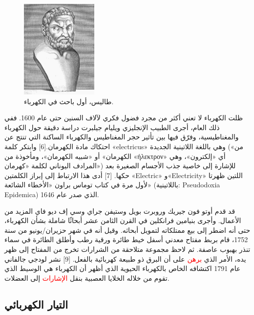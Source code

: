 \documentclass[a4paper]{book}
\begin{document}
\begin{figure}
\centering
  \includegraphics{Thales.png}
  \caption{طاليس، أول باحث في الكهرباء.}
\end{figure}

ظلت الكهرباء لا تعني أكثر من مجرد فضول فكري لآلاف السنين حتى عام
1600. ففي ذلك العام، أجرى الطبيب الإنجليزي ويليام جيلبرت دراسة دقيقة
حول الكهرباء والمغناطيسية، وفرّق فيها بين تأثير حجر المغناطيس والكهرباء
الساكنة التي تنتج عن احتكاك مادة الكهرمان.[6] وابتكر كلمة «electricus»
وهي باللغة اللاتينية الجديدة («من الكهرمان» أو «شبيه الكهرمان»،
ومأخوذة من «ήλεκτρον» أي «إلكترون»، وهي المرادف اليوناني لكلمة
«كهرمان») للإشارة إلى خاصية جذب الأجسام الصغيرة بعد حكها. [7] أدى هذا
الارتباط إلى إبراز الكلمتين «Electric» و«Electricity» اللتين ظهرتا
لأول مرة في كتاب توماس براون «الأخطاء الشائعة» (باللاتينية:
Pseudodoxia Epidemica) الذي صدر عام 1646.

 قد قدم أوتو فون جيريك وروبرت بويل وستيفن جراي وسي إف ديو فاي المزيد من
الأعمال. وأجرى بنيامين فرانكلين في القرن الثامن عشر أبحاثًا شاملة بشأن
الكهرباء، حتى أنه اضطر إلى بيع ممتلكاته لتمويل أبحاثه. وقيل أنه في شهر
حزيران/يونيو من سنة 1752، قام بربط مفتاح معدني أسفل خيط طائرة ورقية
رطب وأطلق الطائرة في سماء تنذر بهبوب عاصفة. ثم لاحظ مجموعة متلاحقة من
الشرارات تخرج من المفتاح إلى ظهر يده، الأمر الذي \textcolor{red}{برهن}
على أن البرق ذو طبيعة كهربائية بالفعل. [9] نشر لودجي جالفاني عام 1791
اكتشافه الخاص بالكهرباء الحيوية الذي أظهر أن الكهرباء هي الوسيط الذي
تقوم من خلاله الخلايا العصبية بنقل \textcolor{red}{الإشارات} إلى
العضلات.

\subsection{التيار الكهربائي}
\end{document}

